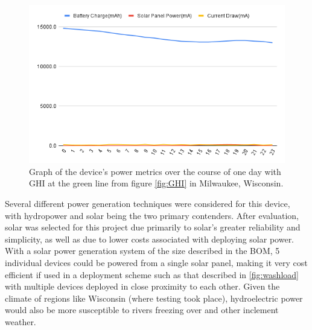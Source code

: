 \documentclass[fleqn,10pt]{SelfArx} %
\begin{document}
	\begin{figure}[h]
		\centering
		\includegraphics[width=1\linewidth]{Figures/green_line_power}
		\caption[Power Consumption Graph]{Graph of the device's power metrics over the course of one day with GHI at the green line from figure \ref{fig:GHI} in Milwaukee, Wisconsin.}
		\label{fig:botPowerGen}
	\end{figure} 
	
	Several different power generation techniques were considered for this device, with hydropower and solar being the two primary contenders. After evaluation, solar was selected for this project due primarily to solar's greater reliability and simplicity, as well as due to lower costs associated with deploying solar power. With a solar power generation system of the size described in the BOM, 5 individual devices could be powered from a single solar panel, making it very cost efficient if used in a deployment scheme such as that described in \ref{fig:washload} with multiple devices deployed in close proximity to each other. Given the climate of regions like Wisconsin (where testing took place), hydroelectric power would also be more susceptible to rivers freezing over and other inclement weather. 
	
\end{document}
